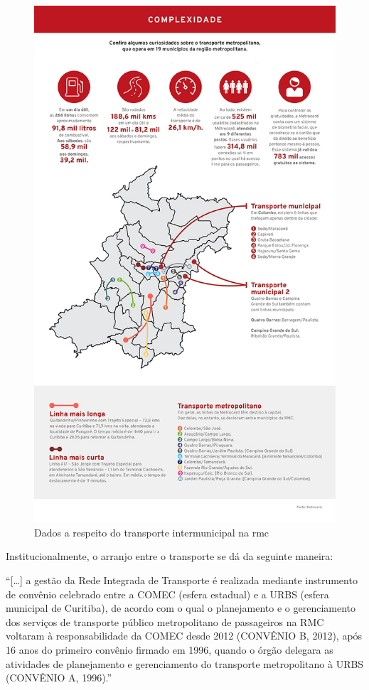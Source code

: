 	\begin{figure}
		\centering
		\caption{Dados a respeito do transporte intermunicipal na \glsdesc{rmc}}
		\label{fig:infograficometrocard}
		\includegraphics[width=0.80\linewidth]{img/gpovo_A}
	\end{figure}
		
	Institucionalmente, o arranjo entre o transporte se dá da seguinte maneira:
	
	\begin{citacao}
		``[\dots] a gestão da Rede Integrada de Transporte é realizada mediante instrumento de convênio celebrado entre a COMEC (esfera estadual) e a URBS (esfera municipal de Curitiba), de acordo com o qual o planejamento e o gerenciamento dos serviços de transporte público metropolitano de passageiros na RMC voltaram à responsabilidade da COMEC desde 2012 (CONVÊNIO B, 2012), após 16 anos do primeiro convênio firmado em 1996, quando o órgão delegara as atividades de planejamento e gerenciamento do transporte metropolitano à URBS (CONVÊNIO A, 1996).'' \cite[p. 386]{paese2014a}
	\end{citacao}

